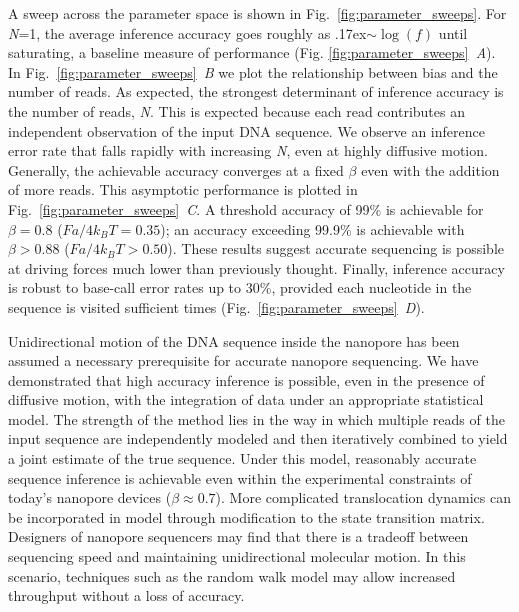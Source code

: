 \documentclass{biophys_letter}
\newcommand{\bias}{\beta}
\newcommand{\kje}[1]{\textcolor{BurntOrange}{#1}}
\begin{document}
A sweep across the parameter space is shown in Fig.~\ref{fig:parameter_sweeps}.
For \emph{N}=1, the average inference accuracy goes roughly as \kje{{\raise.17ex\hbox{$\scriptstyle\sim$}}$\log{(f)}$} until saturating, a baseline measure of performance (Fig. \ref{fig:parameter_sweeps}\emph{~A}).
In Fig.~\ref{fig:parameter_sweeps}\emph{~B} we plot the relationship between bias and the number of reads.
As expected, the strongest determinant of inference accuracy is the number of reads, \emph{N}.
This is expected because each read contributes an independent observation of the input DNA sequence.
We observe an inference error rate that falls rapidly with increasing \emph{N}, even at highly diffusive motion.
Generally, the achievable accuracy converges at a fixed $\bias$ even with the addition of more reads.
This asymptotic performance is plotted in Fig.~\ref{fig:parameter_sweeps}\emph{~C}.
A threshold accuracy of 99\% is achievable for $\bias=0.8$ ($Fa/4k_{B}T=0.35$); an accuracy exceeding 99.9\% is achievable with $\bias>0.88$ ($Fa/4k_{B}T>0.50$).
These results suggest accurate sequencing is possible at driving forces much lower than previously thought.
Finally, inference accuracy is \kje{robust to base-call error rates up to 30\%}, provided each nucleotide in the sequence is visited sufficient times (Fig.~\ref{fig:parameter_sweeps}\emph{~D}).

\kje{Unidirectional} motion of the DNA sequence inside the nanopore has been assumed a necessary prerequisite for accurate nanopore sequencing.
We have demonstrated that high accuracy inference is possible, even in the presence of diffusive motion, with the integration of data under an appropriate statistical model.
The strength of the method lies in the way in which multiple reads of the input sequence are independently modeled and then iteratively combined to yield a joint estimate of the true sequence.
Under this model, reasonably accurate sequence inference is achievable even within the experimental constraints of today's nanopore devices ($\bias\approx 0.7$).
More complicated translocation dynamics can be incorporated in model through modification to the state transition matrix.
Designers of nanopore sequencers may find that there is a tradeoff between sequencing speed and maintaining unidirectional molecular motion.
In this scenario, techniques such as the random walk model may allow increased throughput without a loss of accuracy.
\end{document}
